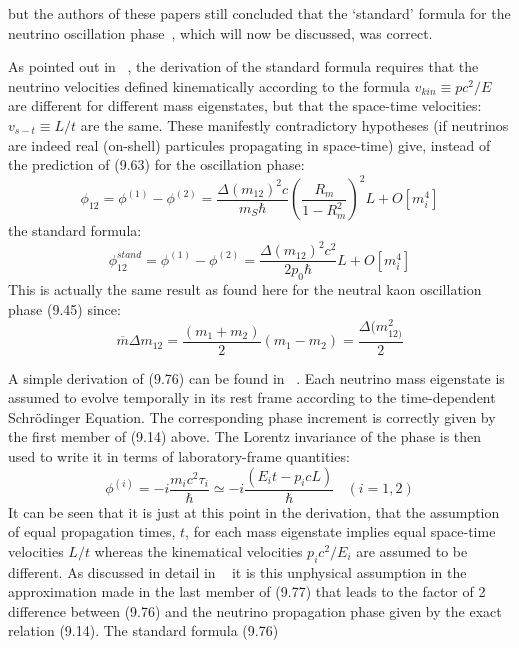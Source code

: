 { but the authors of these papers still concluded that the `standard' formula for the
  neutrino oscillation phase~\cite{Kays04}, which will now be discussed, was correct.
   \par As pointed out in ~\cite{JHF1}, the derivation of the standard formula requires that
   the neutrino velocities defined kinematically according to the formula $v_{kin} \equiv p c^2/E$ are
    different for different mass eigenstates, but that the space-time velocities: $v_{s-t} \equiv L/t$ are the same.
    These manifestly contradictory hypotheses (if neutrinos are indeed real (on-shell) particules propagating
   in space-time) give, instead of the prediction of (9.63) for the oscillation phase:
   \begin{equation}
    \phi_{12} = \phi^{(1)}-  \phi^{(2)} = \frac{\Delta(m_{12})^2 c}{m_S \hbar} \left(\frac{R_m}{1-R_m^2} \right)^2 L 
     +O[m_i^4]
     \end{equation} 
  the standard formula:
   \begin{equation}
    \phi_{12}^{stand} = \phi^{(1)}-  \phi^{(2)} = \frac{\Delta(m_{12})^2 c^2}{2 p_0 \hbar} L 
     +O[m_i^4]
   \end{equation} 
  This is actually the same result as found here for the neutral kaon oscillation phase
 (9.45) since:
   \[ \overline{m} \Delta m_{12} = \frac{(m_1+m_2)}{2}(m_1-m_2) = \frac{\Delta(m_{12)}^2}{2} \]
    \par A simple derivation of (9.76) can be found in ~\cite{Kays04}. Each neutrino mass
   eigenstate is assumed to evolve temporally in its rest frame according to the time-dependent
   Schr\"{o}dinger Equation. The corresponding phase increment is correctly given by
   the first member of (9.14) above. The Lorentz invariance of the phase is then used to write it
  in terms of laboratory-frame quantities:
  \begin{equation}
    \phi^{(i)} = -i \frac{m_ic^2 \tau_i}{\hbar} \simeq -i\frac{(E_i t - p_i c L)}{\hbar}~~~~(i=1,2)
   \end{equation} 
   It can be seen that it is just at this point in the derivation, that the assumption
  of equal propagation times, $t$, for each mass eigenstate implies equal space-time velocities
  $L/t$ whereas the kinematical velocities $p_i c^2/E_i$ are assumed to be different.
  As discussed in detail in ~\cite{JHF1} it is this unphysical assumption in the
   approximation made in the last member of (9.77) that leads
 to the factor of 2 difference between (9.76) 
   and the neutrino propagation phase given by the exact relation (9.14). The standard formula (9.76)
}
